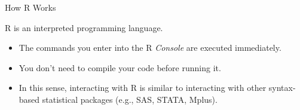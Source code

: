 \documentclass[10pt]{beamer}
\begin{document}

\begin{frame}{How R Works}

  R is an interpreted programming language.
  \vb
  \begin{itemize}
  \item The commands you enter into the R \emph{Console} are executed 
    immediately.
    \vc
  \item You don't need to compile your code before running it.
    \vc
  \item In this sense, interacting with R is similar to interacting with other
    syntax-based statistical packages (e.g., SAS, STATA, Mplus).
  \end{itemize}

\end{frame}

\end{document}
